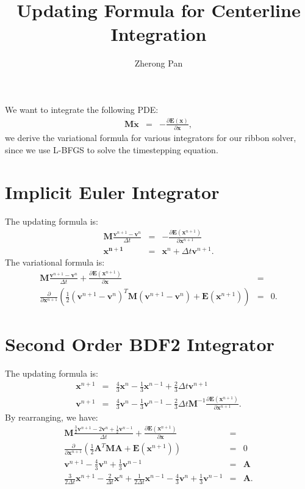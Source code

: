\documentclass[annual]{acmsiggraph}
\title{Updating Formula for Centerline Integration}
\author{Zherong Pan}
\newcommand{\E}[1]{\mathbf{#1}}
\newcommand{\FPP}[2]{\frac{\partial{#1}}{\partial{#2}}}
\begin{document}
\maketitle

We want to integrate the following PDE:
\begin{eqnarray*}
\E{M}\ddot{\E{x}}&=&-\FPP{\E{E}(\E{x})}{\E{x}},
\end{eqnarray*}
we derive the variational formula for various integrators for our ribbon solver, since we use L-BFGS to solve the timestepping equation.

\section{Implicit Euler Integrator}
The updating formula is:
\begin{eqnarray*}
\E{M}\frac{\E{v}^{n+1}-\E{v}^{n}}{\Delta t}&=&-\FPP{\E{E}(\E{x}^{n+1})}{\E{x}^{n+1}}	\\
\E{x^{n+1}}&=&\E{x}^{n}+\Delta t\E{v}^{n+1}.
\end{eqnarray*}
The variational formula is:
\begin{eqnarray*}
\E{M}\frac{\E{v}^{n+1}-\E{v}^{n}}{\Delta t}+\FPP{\E{E}(\E{x}^{n+1})}{\E{x}}&=&	\\
\FPP{}{\E{x}^{n+1}}\left(\frac{1}{2}(\E{v}^{n+1}-\E{v}^{n})^T\E{M}(\E{v}^{n+1}-\E{v}^{n})+\E{E}(\E{x}^{n+1})\right)&=&0.
\end{eqnarray*}

\section{Second Order BDF2 Integrator}
The updating formula is:
\begin{eqnarray*}
\E{x}^{n+1}&=&\frac{4}{3}\E{x}^{n}-\frac{1}{3}\E{x}^{n-1}+\frac{2}{3}\Delta t\E{v}^{n+1}	\\
\E{v}^{n+1}&=&\frac{4}{3}\E{v}^{n}-\frac{1}{3}\E{v}^{n-1}-\frac{2}{3}\Delta t\E{M}^{-1}\FPP{\E{E}(\E{x}^{n+1})}{\E{x}^{n+1}}.
\end{eqnarray*}
By rearranging, we have:
\begin{eqnarray*}
\E{M}\frac{\frac{3}{2}\E{v}^{n+1}-2\E{v}^{n}+\frac{1}{2}\E{v}^{n-1}}{\Delta t}+\FPP{\E{E}(\E{x}^{n+1})}{\E{x}}&=&	\\
\FPP{}{\E{x}^{n+1}}\left(\frac{1}{2}\E{A}^T\E{M}\E{A}+\E{E}(\E{x}^{n+1})\right)&=&0	\\
\E{v}^{n+1}-\frac{4}{3}\E{v}^{n}+\frac{1}{3}\E{v}^{n-1}&=&\E{A}	\\
\frac{3}{2\Delta t}\E{x}^{n+1}-\frac{2}{\Delta t}\E{x}^{n}+\frac{1}{2\Delta t}\E{x}^{n-1}-\frac{4}{3}\E{v}^{n}+\frac{1}{3}\E{v}^{n-1}&=&\E{A}.
\end{eqnarray*}
\end{document}
